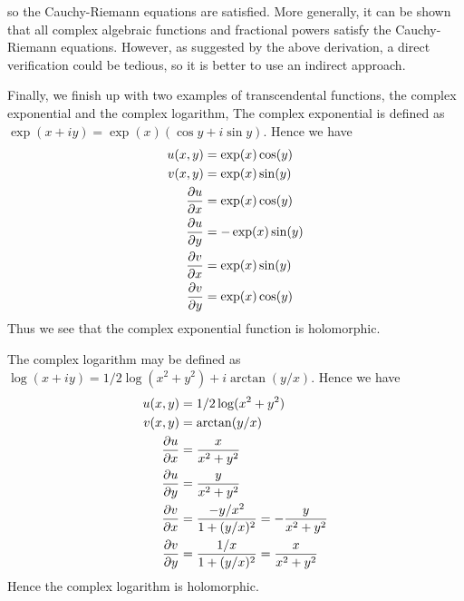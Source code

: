 \documentclass[12pt]{article}
\begin{document}
so the Cauchy-Riemann equations are satisfied.  More
generally, it can be shown that all complex algebraic
functions and fractional powers satisfy the
Cauchy-Riemann equations.  However, as suggested by
the above derivation, a direct verification could
be tedious, so it is better to use an indirect approach.

Finally, we finish up with two examples of transcendental
functions, the complex exponential and the complex logarithm,
The complex exponential is defined as
$\exp (x + iy) = \exp (x) (\cos y + i \sin y)$.  Hence
we have
\begin{align*}
 u (x,y) &= \exp (x) \cos (y) \\
 v (x,y) &= \exp (x) \sin (y) \\
 {\partial u \over \partial x} &= \exp (x) \cos (y) \\
 {\partial u \over \partial y} &= -\exp (x) \sin (y) \\
 {\partial v \over \partial x} &= \exp (x) \sin (y) \\
 {\partial v \over \partial y} &= \exp (x) \cos (y) 
\end{align*}
Thus we see that the complex exponential function is holomorphic.

The complex logarithm may be defined as $\log (x + iy) =
1/2 \log (x^2 + y^2) + i \arctan (y/x)$.  Hence we have
\begin{align*}
 u(x,y) &= 1/2 \log (x^2 + y^2) \\
 v(x,y) &= \arctan (y/x) \\
 {\partial u \over \partial x} &= {x \over x^2 + y^2} \\
 {\partial u \over \partial y} &= {y \over x^2 + y^2} \\
 {\partial v \over \partial x} &= {-y/x^2 \over 1 + (y/x)^2}
                                = - {y \over x^2 + y^2} \\
 {\partial v \over \partial y} &= {1/x \over 1 + (y/x)^2} 
                                = {x \over x^2 + y^2} 
\end{align*}
Hence the complex logarithm is holomorphic.
\end{document}
